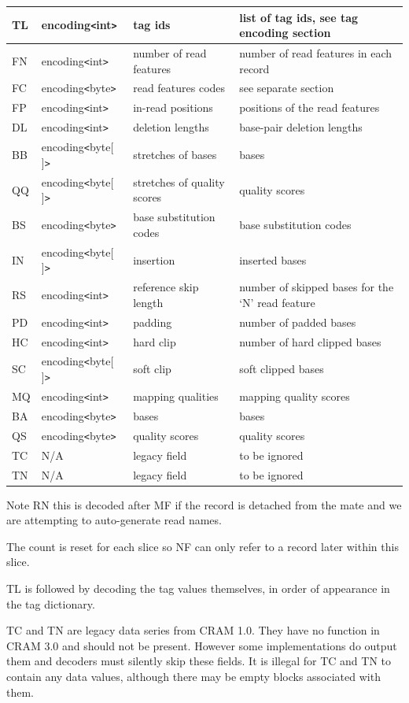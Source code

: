 \documentclass[a4paper]{article}
\begin{document}
\begin{threeparttable}[t]
\begin{tabular}{|l|l|>{\raggedright}p{100pt}|>{\raggedright}p{220pt}|}
\hline
TL\tnote{c} & encoding\texttt{<}int\texttt{>} & tag ids  & list of tag ids, see tag encoding
section\tabularnewline
\hline
FN & encoding\texttt{<}int\texttt{>} & number of read features & number of read
features in each record\tabularnewline
\hline
FC & encoding\texttt{<}byte\texttt{>} & read features codes & see separate section\tabularnewline
\hline
FP & encoding\texttt{<}int\texttt{>} & in-read positions & positions of the read
features\tabularnewline
\hline
DL & encoding\texttt{<}int\texttt{>} & deletion lengths & base-pair deletion lengths\tabularnewline
\hline
BB & encoding\texttt{<}byte[ ]\texttt{>} & stretches of bases & bases\tabularnewline
\hline
QQ & encoding\texttt{<}byte[ ]\texttt{>} & stretches of quality scores & quality scores\tabularnewline
\hline
BS & encoding\texttt{<}byte\texttt{>} & base substitution codes & base substitution
codes\tabularnewline
\hline
IN & encoding\texttt{<}byte[ ]\texttt{>} & insertion & inserted bases\tabularnewline
\hline
RS & encoding\texttt{<}int\texttt{>} & reference skip length & number of skipped 
bases for the `N' read feature\tabularnewline
\hline
PD & encoding\texttt{<}int\texttt{>} & padding & number of padded bases\tabularnewline
\hline
HC & encoding\texttt{<}int\texttt{>} & hard clip & number of hard clipped bases\tabularnewline
\hline
SC & encoding\texttt{<}byte[ ]\texttt{>} & soft clip & soft clipped bases\tabularnewline
\hline
MQ & encoding\texttt{<}int\texttt{>} & mapping qualities & mapping quality scores\tabularnewline
\hline
BA & encoding\texttt{<}byte\texttt{>} & bases & bases\tabularnewline
\hline
QS & encoding\texttt{<}byte\texttt{>} & quality scores & quality scores\tabularnewline
\hline
TC\tnote{d} & N/A & legacy field & to be ignored\tabularnewline
\hline
TN\tnote{d} & N/A & legacy field & to be ignored\tabularnewline
\end{tabular}

\begin{tablenotes}
\item[a] Note RN this is decoded after MF if the record is detached from the mate and we are attempting to auto-generate read names.
\item[b] The count is reset for each slice so NF can only refer to a record later within this slice.
\item[c] TL is followed by decoding the tag values themselves, in order of appearance in the tag dictionary.
\item[d] TC and TN are legacy data series from CRAM 1.0.
They have no function in CRAM 3.0 and should not be present.
However some implementations do output them and decoders must silently skip these fields.
It is illegal for TC and TN to contain any data values, although there
may be empty blocks associated with them.
\end{tablenotes}
\end{threeparttable}
\end{document}
